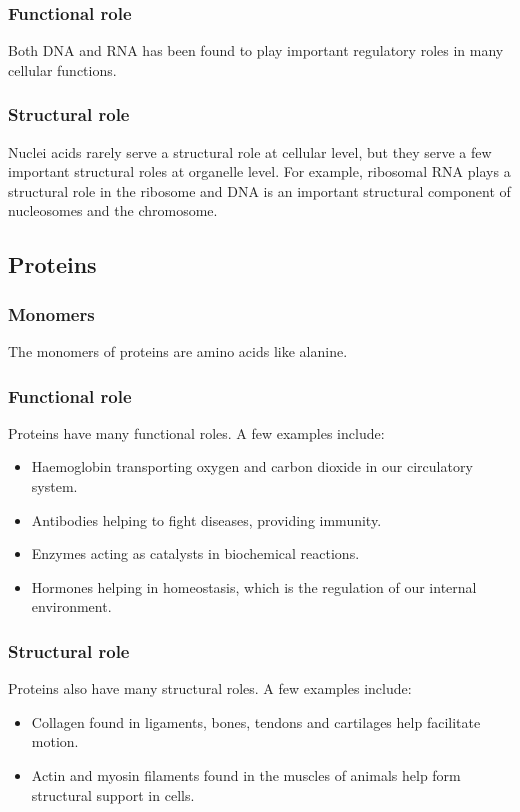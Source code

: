 \documentclass[11pt]{article}
\begin{document}
\subsubsection{Functional role}
\label{sec:org5933e4b}
Both DNA and RNA has been found to play important regulatory roles in many cellular functions.

\subsubsection{Structural role}
\label{sec:org03376ac}
Nuclei acids rarely serve a structural role at cellular level, but they serve a few important structural roles at organelle level. For example, ribosomal RNA plays a structural role in the ribosome and DNA is an important structural component of nucleosomes and the chromosome.

\subsection{Proteins}
\label{sec:org9b85eae}

\subsubsection{Monomers}
\label{sec:orgbb8eacf}
The monomers of proteins are amino acids like alanine.

\subsubsection{Functional role}
\label{sec:orgbfabf58}
Proteins have many functional roles. A few examples include:
\begin{itemize}
\item Haemoglobin transporting oxygen and carbon dioxide in our circulatory system.
\item Antibodies helping to fight diseases, providing immunity.
\item Enzymes acting as catalysts in biochemical reactions.
\item Hormones helping in homeostasis, which is the regulation of our internal environment.
\end{itemize}

\subsubsection{Structural role}
\label{sec:org41fba87}
Proteins also have many structural roles. A few examples include:
\begin{itemize}
\item Collagen found in ligaments, bones, tendons and cartilages help facilitate motion.
\item Actin and myosin filaments found in the muscles of animals help form structural support in cells.
\end{itemize}
\end{document}

